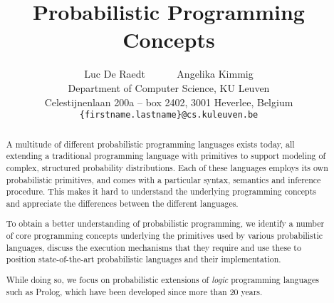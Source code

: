 \documentclass[a4paper]{article}
\begin{document}
\title{Probabilistic Programming Concepts}

\author{Luc De Raedt ~~~~~ Angelika Kimmig \\ \small{Department of Computer Science, KU Leuven}\\
       \small{Celestijnenlaan 200a -- box 2402, 3001 Heverlee, Belgium}\\
              \small{\texttt{\{firstname.lastname\}@cs.kuleuven.be}}    
}

\date{}


\maketitle



\begin{abstract}
A multitude of different probabilistic programming languages exists
today, all extending a traditional programming language with
primitives to support modeling of complex, structured probability distributions. 
Each of these languages employs its own probabilistic primitives, and comes with a particular syntax, semantics 
and inference procedure.  This makes it hard to understand the underlying programming concepts
and appreciate the differences between the different languages. 

To obtain a better understanding of probabilistic programming, we 
identify a number of core programming concepts underlying the primitives used by various probabilistic languages,
discuss the execution mechanisms that they require and use these to position state-of-the-art probabilistic 
languages and their implementation.  

While doing so, we focus on probabilistic extensions of {\em logic} programming languages such as Prolog, 
which have been developed since more than 20 years.
\end{abstract}
\end{document}
